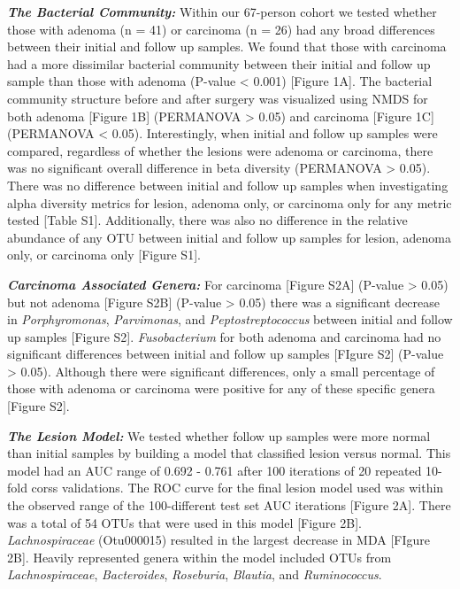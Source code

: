 \documentclass[12pt,]{article}
\begin{document}
\textbf{\emph{The Bacterial Community:}} Within our 67-person cohort we
tested whether those with adenoma (n = 41) or carcinoma (n = 26) had any
broad differences between their initial and follow up samples. We found
that those with carcinoma had a more dissimilar bacterial community
between their initial and follow up sample than those with adenoma
(P-value \textless{} 0.001) {[}Figure 1A{]}. The bacterial community
structure before and after surgery was visualized using NMDS for both
adenoma {[}Figure 1B{]} (PERMANOVA \textgreater{} 0.05) and carcinoma
{[}Figure 1C{]} (PERMANOVA \textless{} 0.05). Interestingly, when
initial and follow up samples were compared, regardless of whether the
lesions were adenoma or carcinoma, there was no significant overall
difference in beta diversity (PERMANOVA \textgreater{} 0.05). There was
no difference between initial and follow up samples when investigating
alpha diversity metrics for lesion, adenoma only, or carcinoma only for
any metric tested {[}Table S1{]}. Additionally, there was also no
difference in the relative abundance of any OTU between initial and
follow up samples for lesion, adenoma only, or carcinoma only {[}Figure
S1{]}.

\textbf{\emph{Carcinoma Associated Genera:}} For carcinoma {[}Figure
S2A{]} (P-value \textgreater{} 0.05) but not adenoma {[}Figure S2B{]}
(P-value \textgreater{} 0.05) there was a significant decrease in
\emph{Porphyromonas}, \emph{Parvimonas}, and \emph{Peptostreptococcus}
between initial and follow up samples {[}Figure S2{]}.
\emph{Fusobacterium} for both adenoma and carcinoma had no significant
differences between initial and follow up samples {[}FIgure S2{]}
(P-value \textgreater{} 0.05). Although there were significant
differences, only a small percentage of those with adenoma or carcinoma
were positive for any of these specific genera {[}Figure S2{]}.

\textbf{\emph{The Lesion Model:}} We tested whether follow up samples
were more normal than initial samples by building a model that
classified lesion versus normal. This model had an AUC range of 0.692 -
0.761 after 100 iterations of 20 repeated 10-fold corss validations. The
ROC curve for the final lesion model used was within the observed range
of the 100-different test set AUC iterations {[}Figure 2A{]}. There was
a total of 54 OTUs that were used in this model {[}Figure 2B{]}.
\emph{Lachnospiraceae} (Otu000015) resulted in the largest decrease in
MDA {[}FIgure 2B{]}. Heavily represented genera within the model
included OTUs from \emph{Lachnospiraceae}, \emph{Bacteroides},
\emph{Roseburia}, \emph{Blautia}, and \emph{Ruminococcus}.
\end{document}
